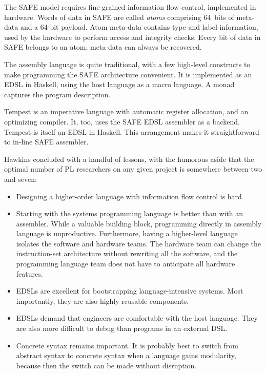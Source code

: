 \documentclass{jfp1}
\begin{document}
The SAFE model requires fine-grained information flow control, implemented
in hardware. Words of data in SAFE are called \textit{atoms} comprising
64~bits of meta-data and a 64-bit payload. Atom meta-data contains type
and label information, used by the hardware to perform access and
integrity checks. Every bit of data in SAFE belongs to an atom; meta-data
can always be recovered.

The assembly language is quite traditional, with a few high-level
constructs to make programming the SAFE architecture convenient. It is
implemented as an EDSL in Haskell, using the host language as a macro
language. A monad captures the program description.

Tempest is an imperative language with automatic register allocation, and
an optimizing compiler. It, too, uses the SAFE EDSL assembler as a
backend. Tempest is itself an EDSL in Haskell. This arrangement makes it
straightforward to in-line SAFE assembler.

Hawkins concluded with a handful of lessons, with the humorous aside that
the optimal number of PL researchers on any given project is somewhere
between two and seven:
\begin{itemize}

\item Designing a higher-order language with information flow control
is hard. 

\item Starting with the systems programming language is better than with
an assembler.  While a valuable building block, programming directly in
assembly language is unproductive. Furthermore, having a higher-level
language isolates the software and hardware teams. The hardware team can
change the instruction-set architecture without rewriting all the
software, and the programming language team does not have to anticipate
all hardware features. 

\item EDSLs are excellent for bootstrapping language-intensive systems.
Most importantly, they are also highly reusable components.

\item EDSLs demand that engineers are comfortable with the host language.
They are also more difficult to debug than programs in an external DSL. 

\item Concrete syntax remains important. It is probably best to switch
from abstract syntax to concrete syntax when a language gains modularity,
because then the switch can be made without disruption.
\end{itemize}
\end{document}
